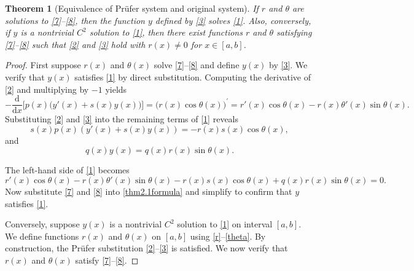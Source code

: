 \documentclass[11pt, reqno]{amsart}
\numberwithin{equation}{section}  %
\theoremstyle{plain}
\newtheorem{theorem}{Theorem}[section]
\theoremstyle{definition}
\theoremstyle{remark}
\begin{document}
\begin{theorem}[Equivalence of Pr\"ufer system and original system]
\label{thm:equivalence}
If $r$ and $\theta$ are solutions to \eqref{7}--\eqref{8}, then the function $y$ defined by \eqref{3} solves \eqref{1}. Also, conversely, if $y$ is a nontrivial $C^2$ solution to \eqref{1}, then there exist functions $r$ and $\theta$ satisfying \eqref{7}--\eqref{8} such that \eqref{2} and \eqref{3} hold with $r(x)\neq 0$ for $x \in [a,b]$. 
\end{theorem}

\begin{proof}
First suppose $r(x)$ and $\theta (x)$ solve \eqref{7}--\eqref{8} and define $y(x)$ by \eqref{3}. We verify that $y(x)$ satisfies \eqref{1} by direct substitution. Computing the derivative of \eqref{2} and multiplying by $-1$ yields
\[-\dfrac{\mathrm{d}}{\mathrm{d}x}\Big[ p(x)\big(y'(x)+s(x)y(x)\big)\Big]=\big(r(x) \cos\theta(x)\big)^\prime=r'(x) \cos\theta(x)-r(x)\theta'(x)\sin\theta(x).\]
Substituting \eqref{2} and \eqref{3} into the remaining terms of \eqref{1} reveals
\[s(x)p(x)(y'(x)+s(x)y(x)) = -r(x)s(x)\cos\theta(x),\]
and
\[q(x)y(x)=q(x)r(x)\sin\theta(x).\]

The left-hand side of \eqref{1} becomes
\begin{equation} 
r'(x)\cos\theta(x)-r(x)\theta'(x)\sin\theta(x)-r(x)s(x)\cos\theta(x)+q(x)r(x)\sin\theta(x)=0.
\label{thm2.1formula}
\end{equation}
Now substitute \eqref{7} and \eqref{8} into \eqref{thm2.1formula} and simplify to confirm that $y$ satisfies \eqref{1}.

Conversely, suppose $y(x)$ is a nontrivial $C^2$ solution to \eqref{1} on interval $[a,b]$. We define functions $r(x)$ and $\theta (x)$ on $[a,b]$ using \eqref{r}--\eqref{theta}. By construction, the Pr\"ufer substitution \eqref{2}--\eqref{3} is satisfied. We now verify that $r(x)$ and $\theta (x)$ satisfy \eqref{7}--\eqref{8}.


\end{proof}
\end{document}
